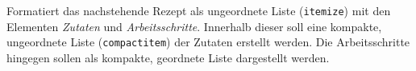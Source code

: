 Formatiert das nachstehende Rezept als ungeordnete Liste (\texttt{itemize}) mit den Elementen \emph{Zutaten} und \emph{Arbeitsschritte}. Innerhalb dieser soll eine kompakte, ungeordnete Liste (\texttt{compactitem}) der Zutaten erstellt werden. Die Arbeitsschritte hingegen sollen als kompakte, geordnete Liste dargestellt werden.

